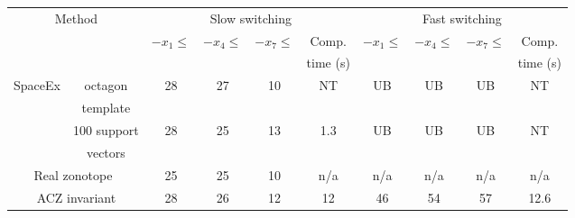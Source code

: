\begin{table}
\begin{tabular}{|l|c|c|c|c|c|c|c|c|c|}
\hline
\multicolumn{2}{|c|}{\multirow{4}{*}{Method}} & \multicolumn{4}{|c|}{\multirow{2}{*}{Slow switching}} & \multicolumn{4}{|c|}{\multirow{2}{*}{Fast switching}}\\
\multicolumn{2}{|c|}{} & \multicolumn{4}{|c|}{} & \multicolumn{4}{|c|}{} \\
\cline{3-10}
\multicolumn{2}{|c|}{} & \multirow{2}{*}{$-x_1\leq$} & \multirow{2}{*}{$-x_4\leq$} & \multirow{2}{*}{$-x_7\leq$} & Comp. & \multirow{2}{*}{$-x_1\leq$} & \multirow{2}{*}{$-x_4\leq$} & \multirow{2}{*}{$-x_7\leq$} & Comp.\\
\multicolumn{2}{|c|}{} & & & & time (s) & & & & time (s)\\
\hline
\multirow{4}{*}{SpaceEx} & octagon & \multirow{2}{*}{28} &
\multirow{2}{*}{27} & \multirow{2}{*}{10} &
\multirow{2}{*}{NT} & \multirow{2}{*}{UB} &
\multirow{2}{*}{UB} & \multirow{2}{*}{UB} &
\multirow{2}{*}{NT}\\
& template & & & & & & & &\\
\cline{2-10}
& 100 support & \multirow{2}{*}{28} & \multirow{2}{*}{25} &
\multirow{2}{*}{13} & \multirow{2}{*}{1.3} & \multirow{2}{*}{UB} & \multirow{2}{*}{UB} &
\multirow{2}{*}{UB} & \multirow{2}{*}{NT}\\
& vectors & & & & & & & &\\
\hline
\multicolumn{2}{|c|}{\multirow{2}{*}{Real zonotope~\cite{makhlouf2014networked}}} &
\multirow{2}{*}{25} & \multirow{2}{*}{25} & \multirow{2}{*}{10}
 & \multirow{2}{*}{n/a} & \multirow{2}{*}{n/a} & \multirow{2}{*}{n/a} & \multirow{2}{*}{n/a}
 & \multirow{2}{*}{n/a}\\
\multicolumn{2}{|c|}{} & & & & & & & &\\
\hline
\multicolumn{2}{|c|}{\multirow{2}{*}{ACZ invariant}} &
\multirow{2}{*}{28} & \multirow{2}{*}{26} &
\multirow{2}{*}{12} & \multirow{2}{*}{12} &
\multirow{2}{*}{46} & \multirow{2}{*}{54} &
\multirow{2}{*}{57} & \multirow{2}{*}{12.6}\\
\multicolumn{2}{|c|}{} & & & & & & & &\\
\hline
\end{tabular}
%

\end{table}

